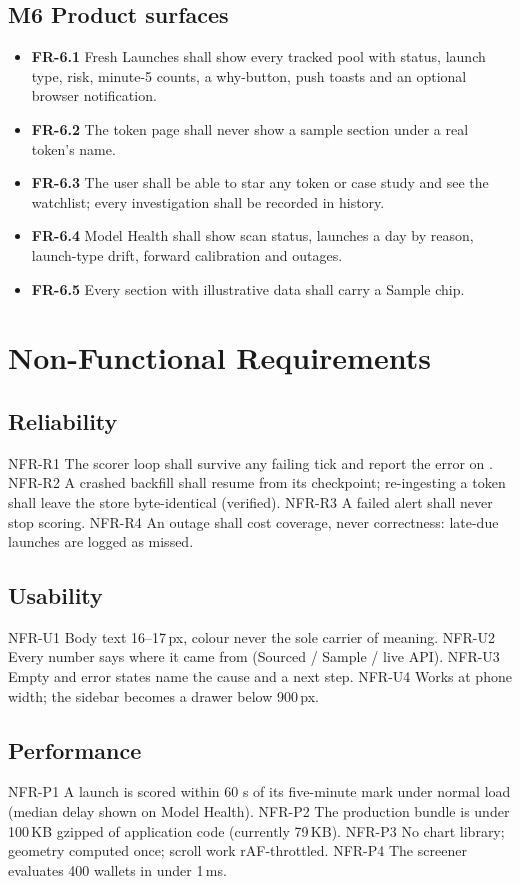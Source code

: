 \subsection{M6 Product surfaces}
\begin{itemize}[label={}]
  \item \textbf{FR-6.1} Fresh Launches shall show every tracked pool with status, launch type, risk, minute-5 counts, a why-button, push toasts and an optional browser notification.
  \item \textbf{FR-6.2} The token page shall never show a sample section under a real token's name.
  \item \textbf{FR-6.3} The user shall be able to star any token or case study and see the watchlist; every investigation shall be recorded in history.
  \item \textbf{FR-6.4} Model Health shall show scan status, launches a day by reason, launch-type drift, forward calibration and outages.
  \item \textbf{FR-6.5} Every section with illustrative data shall carry a Sample chip.
\end{itemize}

\section{Non-Functional Requirements}
\subsection{Reliability}
NFR-R1 The scorer loop shall survive any failing tick and report the error on . NFR-R2 A crashed backfill shall resume from its checkpoint; re-ingesting a token shall leave the store byte-identical (verified). NFR-R3 A failed alert shall never stop scoring. NFR-R4 An outage shall cost coverage, never correctness: late-due launches are logged as missed.
\subsection{Usability}
NFR-U1 Body text 16--17\,px, colour never the sole carrier of meaning. NFR-U2 Every number says where it came from (Sourced / Sample / live API). NFR-U3 Empty and error states name the cause and a next step. NFR-U4 Works at phone width; the sidebar becomes a drawer below 900\,px.
\subsection{Performance}
NFR-P1 A launch is scored within 60 s of its five-minute mark under normal load (median delay shown on Model Health). NFR-P2 The production bundle is under 100\,KB gzipped of application code (currently 79\,KB). NFR-P3 No chart library; geometry computed once; scroll work rAF-throttled. NFR-P4 The screener evaluates 400 wallets in under 1\,ms.
